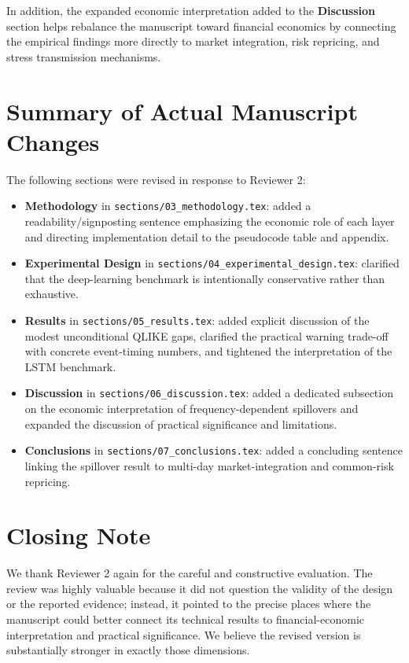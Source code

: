 \documentclass[11pt,a4paper]{article}
\begin{document}
In addition, the expanded economic interpretation added to the \textbf{Discussion} section helps rebalance the manuscript toward financial economics by connecting the empirical findings more directly to market integration, risk repricing, and stress transmission mechanisms.

\section*{Summary of Actual Manuscript Changes}

The following sections were revised in response to Reviewer 2:
\begin{itemize}[leftmargin=1.5em]
\item \textbf{Methodology} in \texttt{sections/03\_methodology.tex}: added a readability/signposting sentence emphasizing the economic role of each layer and directing implementation detail to the pseudocode table and appendix.
\item \textbf{Experimental Design} in \texttt{sections/04\_experimental\_design.tex}: clarified that the deep-learning benchmark is intentionally conservative rather than exhaustive.
\item \textbf{Results} in \texttt{sections/05\_results.tex}: added explicit discussion of the modest unconditional QLIKE gaps, clarified the practical warning trade-off with concrete event-timing numbers, and tightened the interpretation of the LSTM benchmark.
\item \textbf{Discussion} in \texttt{sections/06\_discussion.tex}: added a dedicated subsection on the economic interpretation of frequency-dependent spillovers and expanded the discussion of practical significance and limitations.
\item \textbf{Conclusions} in \texttt{sections/07\_conclusions.tex}: added a concluding sentence linking the spillover result to multi-day market-integration and common-risk repricing.
\end{itemize}

\section*{Closing Note}

We thank Reviewer 2 again for the careful and constructive evaluation. The review was highly valuable because it did not question the validity of the design or the reported evidence; instead, it pointed to the precise places where the manuscript could better connect its technical results to financial-economic interpretation and practical significance. We believe the revised version is substantially stronger in exactly those dimensions.
\end{document}

